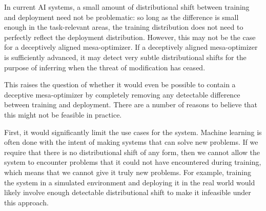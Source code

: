 \documentclass[
  onecolumn,
  natbib,
]{miri-tech-article}
\begin{document}
In current AI systems, a small amount of distributional shift between training and deployment need not be problematic: so long as the difference is small enough in the task-relevant areas, the training distribution does not need to perfectly reflect the deployment distribution. However, this may not be the case for a deceptively aligned mesa-optimizer. If a deceptively aligned mesa-optimizer is sufficiently advanced, it may detect very subtle distributional shifts for the purpose of inferring when the threat of modification has ceased.

This raises the question of whether it would even be possible to contain a deceptive mesa-optimizer by completely removing any detectable difference between training and deployment. There are a number of reasons to believe that this might not be feasible in practice.

First, it would significantly limit the use cases for the system. Machine learning is often done with the intent of making systems that can solve new problems. If we require that there is no distributional shift of any form, then we cannot allow the system to encounter problems that it could not have encountered during training, which means that we cannot give it truly new problems. For example, training the system in a simulated environment and deploying it in the real world would likely involve enough detectable distributional shift to make it infeasible under this approach.
\end{document}
